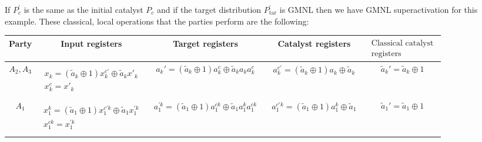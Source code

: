 \documentclass[pra,aps,reprint,superscriptaddress]{revtex4-2}
\theoremstyle{theorem}
\begin{document}
If $P^{\prime}_c$ is the same as the initial catalyst $P_c$ and if the target distribution $P^{\prime}_{\mathrm{tar}}$ is GMNL 
then we have GMNL superactivation for this example. These classical, local operations that the parties perform are the following:
\begin{widetext}
\centering
\begin{tabular}{|c|c|c|c|c|}
\hline
Party & Input registers & Target registers & Catalyst registers & $\begin{array}{c}
     \text{Classical catalyst} \\
     \text{registers} 
\end{array}$ \\
\hline
$A_2,A_3$ &
$\begin{array}{c}\\[-10pt]
     x_k=(\tilde a_k\oplus1)x_k^{c\prime} \oplus \tilde a_kx'_k \\[2pt]
     x^c_k= x'_k\\[1.5pt]
\end{array}$
&
$\begin{array}{c}
a_k'=(\tilde a_k\oplus1)a_k^c \oplus \tilde a_k a_ka_k^c %
\end{array}$ &
$\begin{array}{c}
a_k^{c\prime}=(\tilde a_k\oplus1)a_k \oplus \tilde a_k %
\end{array}$ &
$\tilde a_k'=\tilde a_k\oplus1$ \\
\hline
$A_1$ &
$\begin{array}{c}\\[-10pt]
     x^k_1=(\tilde a_1\oplus1)x_1^{c\prime k} \oplus \tilde a_1 x^{\prime k}_1 \\[2pt]
     x^{ck}_1= x^{\prime k}_1\\[1.5pt]
\end{array}$
&
$\begin{array}{c}
a_1^{\prime k}=(\tilde a_1\oplus1)a_1^{ck}\oplus \tilde a_1a_1^ka_1^{ck} %
\end{array}$ &
$\begin{array}{c}
a_1^{c\prime k}=(\tilde a_1\oplus1)a_1^k\oplus \tilde a_1 %
\end{array}$ &
$\tilde a_1'=\tilde a_1\oplus1$ \\
\hline
\end{tabular}
\end{widetext}
\end{document}
